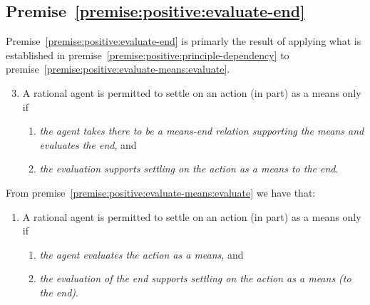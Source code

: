 \documentclass[10pt]{article}
\newcommand{\hozlinedash}[0]{%
  \noindent\hdashrule[0.5ex][c]{\textwidth}{.1pt}{2.5pt}
}
\begin{document}
\newpage


\subsection{Premise~\ref{premise:positive:evaluate-end}}
\label{sec:premise:positive:evaluate-end}

Premise~\ref{premise:positive:evaluate-end} is primarly the result of applying what is established in premise~\ref{premise:positive:principle-dependency} to premise~\ref{premise:positive:evaluate-means:evaluate}.

\hozlinedash

\begin{enumerate}[label=P\arabic*., ref=(P\arabic*)]
\setcounter{enumi}{2}
\item A rational agent is permitted to settle on an action (in part) as a means only if
  \begin{enumerate}[label=P\arabic{enumi}\alph*., ref=(P\arabic{enumi}\alph*)]
  \item \emph{the agent takes there to be a means-end relation supporting the means and evaluates the end}, and
  \item \emph{the evaluation supports settling on the action as a means to the end}.
  \end{enumerate}
\end{enumerate}

\hozlinedash

From premise~\ref{premise:positive:evaluate-means:evaluate} we have that:

\begin{enumerate}[label=P\arabic*., ref=(P\arabic*)]
\item A rational agent is permitted to settle on an action (in part) as a means only if
  \begin{enumerate}[label=P\arabic{enumi}\alph*., ref=(P\arabic{enumi}\alph*)]
  \item \emph{the agent evaluates the action as a means}, and
  \item \emph{the evaluation of the end supports settling on the action as a means (to the end)}.
  \end{enumerate}
\end{enumerate}
\end{document}
